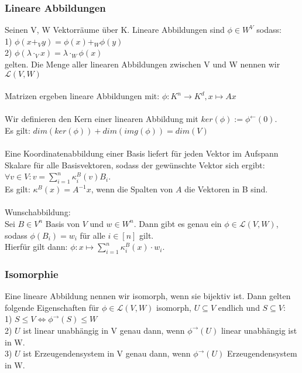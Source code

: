 \documentclass{article}
\begin{document}
\subsubsection*{Lineare Abbildungen}
Seinen V, W Vektorräume über K. Lineare Abbildungen sind \(\phi \in W^V\) sodass: \\
1) \(\phi(x +_V y) = \phi(x) +_W \phi(y)\) \\
2) \(\phi(\lambda \cdot_V x) = \lambda \cdot_W \phi(x)\) \\
gelten. Die Menge aller linearen Abbildungen zwischen V und W nennen wir \(\mathcal L(V,W)\) \\ \\
Matrizen ergeben lineare Abbildungen mit: \(\phi : K^n \rightarrow K^d, x \mapsto Ax\) \\ \\
Wir definieren den Kern einer linearen Abbildung mit \(ker(\phi) := \phi^\leftarrow(0)\). \\
Es gilt: \(dim(ker(\phi)) + dim(img(\phi)) = dim(V)\) \\ \\
Eine Koordinatenabbildung einer Basis liefert für jeden Vektor im Aufspann Skalare für alle Basisvektoren, sodass der gewünschte Vektor sich ergibt: \\
\(\forall v \in V: v = \sum_{i=1}^{n} \kappa_i^B(v)B_i\). \\
Es gilt: \(\kappa^B(x) = A^{-1}x\), wenn die Spalten von \(A\) die Vektoren in B sind. \\ \\
Wunschabbildung: \\
Sei \(B\in V^n\) Basis von \(V\) und \(w \in W^n\). Dann gibt es genau ein \(\phi \in \mathcal L(V,W)\), sodass \(\phi(B_i) = w_i\) für alle \(i \in [n]\) gilt. \\
Hierfür gilt dann: \(\phi: x\mapsto \sum_{i=1}^{n}\kappa_i^B(x)\cdot w_i\).
\subsubsection*{Isomorphie}
Eine lineare Abbildung nennen wir isomorph, wenn sie bijektiv ist. Dann gelten folgende Eigenschaften für \(\phi \in \mathcal{L}(V,W)\) isomorph, \(U \subseteq V\) endlich und \(S \subseteq V\):\\
1) \(S \le V \Longleftrightarrow \phi^\rightarrow(S) \le W\) \\
2) \(U\) ist linear unabhängig in V genau dann, wenn \(\phi^\rightarrow (U)\) linear unabhängig ist in W. \\
3) \(U\) ist Erzeugendensystem in V genau dann, wenn \(\phi^\rightarrow (U)\) Erzeugendensystem in W.
\end{document}
